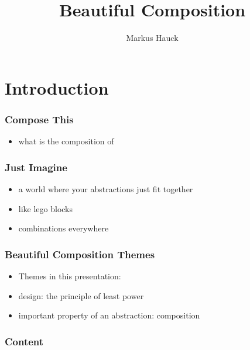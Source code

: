 \documentclass[aspectratio=169]{beamer}
\title{Beautiful Composition}
\author{Markus Hauck}
\begin{document}
\begin{frame}
  \titlepage{}
\end{frame}

\section{Introduction}\label{sec:introduction}

\begin{frame}
  \frametitle{Compose This}
  \begin{itemize}
  \item what is the composition of
  \end{itemize}
\end{frame}

\begin{frame}
  \frametitle{Just Imagine}
  \begin{itemize}
  \item a world where your abstractions just fit together
  \item like lego blocks
  \item combinations everywhere
  \end{itemize}
\end{frame}

\begin{frame}
  \frametitle{Beautiful Composition \textemdash{} Themes}
  {
  }
  \begin{itemize}
  \item Themes in this presentation:
  \item design: the principle of least power
  \item important property of an abstraction: composition
  \end{itemize}
\end{frame}

\begin{frame}[fragile]
  \frametitle{Content}
  \begin{center}
  \end{center}
\end{frame}
\end{document}
